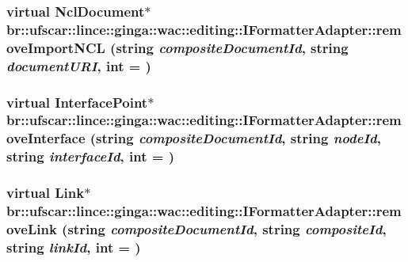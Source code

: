 \hypertarget{classbr_1_1ufscar_1_1lince_1_1ginga_1_1wac_1_1editing_1_1IFormatterAdapter_a14823ca74a5d4abaf1fe46667a1444a4}{
\subsubsection[{removeImportNCL}]{\setlength{\rightskip}{0pt plus 5cm}virtual NclDocument$\ast$ br::ufscar::lince::ginga::wac::editing::IFormatterAdapter::removeImportNCL (string {\em compositeDocumentId}, \/  string {\em documentURI}, \/  int = {})}}
\label{classbr_1_1ufscar_1_1lince_1_1ginga_1_1wac_1_1editing_1_1IFormatterAdapter_a14823ca74a5d4abaf1fe46667a1444a4}
\hypertarget{classbr_1_1ufscar_1_1lince_1_1ginga_1_1wac_1_1editing_1_1IFormatterAdapter_a55d4af395d4f71bf1976fc9e08f8488a}{
\subsubsection[{removeInterface}]{\setlength{\rightskip}{0pt plus 5cm}virtual InterfacePoint$\ast$ br::ufscar::lince::ginga::wac::editing::IFormatterAdapter::removeInterface (string {\em compositeDocumentId}, \/  string {\em nodeId}, \/  string {\em interfaceId}, \/  int = {})}}
\label{classbr_1_1ufscar_1_1lince_1_1ginga_1_1wac_1_1editing_1_1IFormatterAdapter_a55d4af395d4f71bf1976fc9e08f8488a}
\hypertarget{classbr_1_1ufscar_1_1lince_1_1ginga_1_1wac_1_1editing_1_1IFormatterAdapter_a50258960e9a5f4405e249e58aa2fa109}{
\subsubsection[{removeLink}]{\setlength{\rightskip}{0pt plus 5cm}virtual Link$\ast$ br::ufscar::lince::ginga::wac::editing::IFormatterAdapter::removeLink (string {\em compositeDocumentId}, \/  string {\em compositeId}, \/  string {\em linkId}, \/  int = {})}}
